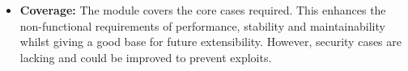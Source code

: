 \documentclass{article}
\begin{document}
    \begin{itemize}
        \item \textbf{Coverage:}
				The module covers the core cases required.
				This enhances the non-functional requirements of performance, stability
				and maintainability whilst giving a good base for future extensibility.
				However, security cases are lacking and could be improved to prevent exploits.
  	\end{itemize}
\end{document}
